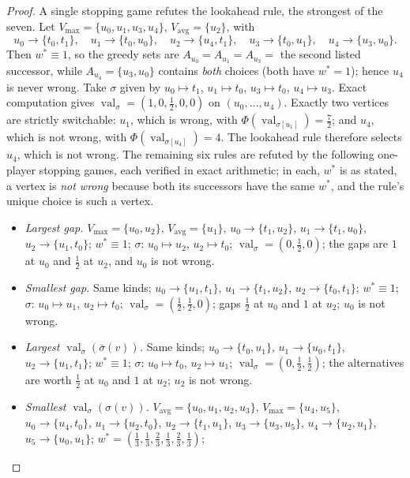 \documentclass[11pt]{article}
\theoremstyle{plain}
\theoremstyle{definition}
\DeclareMathOperator{\val}{val}
\newcommand{\Vmax}{V_{\max}}
\newcommand{\Vavg}{V_{\mathrm{avg}}}
\begin{document}
\begin{proof}
A single stopping game refutes the lookahead rule, the strongest of the
seven. Let $\Vmax=\{u_0,u_1,u_3,u_4\}$, $\Vavg=\{u_2\}$, with
\[
  u_0\to\{t_0,t_1\},\quad u_1\to\{t_0,u_0\},\quad u_2\to\{u_4,t_1\},\quad
  u_3\to\{t_0,u_1\},\quad u_4\to\{u_3,u_0\}.
\]
Then $w^\ast\equiv1$, so the greedy sets are $A_{u_0}=A_{u_1}=A_{u_3}=$
the second listed successor, while $A_{u_4}=\{u_3,u_0\}$ contains
\emph{both} choices (both have $w^\ast=1$); hence $u_4$ is never wrong.
Take $\sigma$ given by $u_0\mapsto t_1$, $u_1\mapsto t_0$,
$u_3\mapsto t_0$, $u_4\mapsto u_3$. Exact computation gives
$\val_\sigma=(1,0,\tfrac12,0,0)$ on $(u_0,\dots,u_4)$. Exactly two
vertices are strictly switchable: $u_1$, which is wrong, with
$\Phi(\val_{\sigma[u_1]})=\tfrac72$; and $u_4$, which is not wrong, with
$\Phi(\val_{\sigma[u_4]})=4$. The lookahead rule therefore selects
$u_4$, which is not wrong. The remaining six rules are refuted by the
following one-player stopping games, each verified in exact arithmetic;
in each, $w^\ast$ is as stated, a vertex is \emph{not wrong} because both
its successors have the same $w^\ast$, and the rule's unique choice is
such a vertex.
\begin{itemize}[leftmargin=2.2em]
\item \emph{Largest gap.} $\Vmax=\{u_0,u_2\}$, $\Vavg=\{u_1\}$,
  $u_0\to\{t_1,u_2\}$, $u_1\to\{t_1,u_0\}$, $u_2\to\{u_1,t_0\}$;
  $w^\ast\equiv1$; $\sigma$: $u_0\mapsto u_2$, $u_2\mapsto t_0$;
  $\val_\sigma=(0,\tfrac12,0)$; the gaps are $1$ at $u_0$ and $\tfrac12$
  at $u_2$, and $u_0$ is not wrong.
\item \emph{Smallest gap.} Same kinds; $u_0\to\{u_1,t_1\}$,
  $u_1\to\{t_1,u_2\}$, $u_2\to\{t_0,t_1\}$; $w^\ast\equiv1$; $\sigma$:
  $u_0\mapsto u_1$, $u_2\mapsto t_0$; $\val_\sigma=(\tfrac12,\tfrac12,0)$;
  gaps $\tfrac12$ at $u_0$ and $1$ at $u_2$; $u_0$ is not wrong.
\item \emph{Largest $\val_\sigma(\bar\sigma(v))$.} Same kinds;
  $u_0\to\{t_0,u_1\}$, $u_1\to\{u_0,t_1\}$, $u_2\to\{u_1,t_1\}$;
  $w^\ast\equiv1$; $\sigma$: $u_0\mapsto t_0$, $u_2\mapsto u_1$;
  $\val_\sigma=(0,\tfrac12,\tfrac12)$; the alternatives are worth
  $\tfrac12$ at $u_0$ and $1$ at $u_2$; $u_2$ is not wrong.
\item \emph{Smallest $\val_\sigma(\sigma(v))$.} $\Vavg=\{u_0,u_1,u_2,u_3\}$,
  $\Vmax=\{u_4,u_5\}$, $u_0\to\{u_4,t_0\}$, $u_1\to\{u_2,t_0\}$,
  $u_2\to\{t_1,u_1\}$, $u_3\to\{u_3,u_5\}$, $u_4\to\{u_2,u_1\}$,
  $u_5\to\{u_0,u_1\}$;
  $w^\ast=(\tfrac13,\tfrac13,\tfrac23,\tfrac13,\tfrac23,\tfrac13)$;

\end{itemize}
\end{proof}
\end{document}
